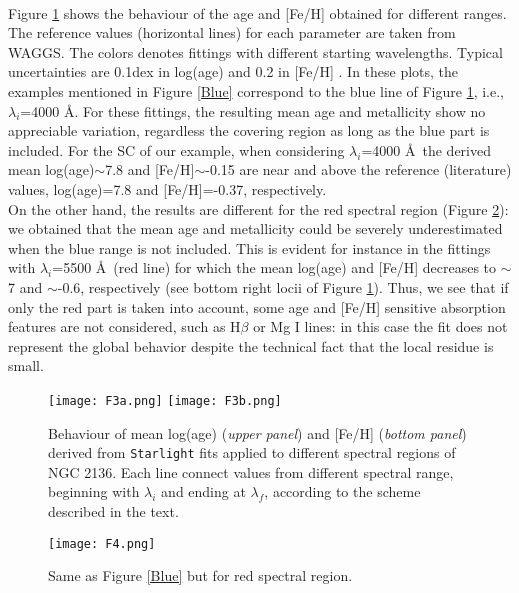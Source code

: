\documentclass[baaa]{baaa}
\begin{document}
\

Figure \ref{Plots} shows the behaviour of the age and [Fe/H] obtained for different ranges. The reference values (horizontal lines) for each parameter are taken from WAGGS. The colors denotes fittings with different starting wavelengths. Typical uncertainties are 0.1dex in log(age) and 0.2 in [Fe/H] \citep{CR2010b}. In these plots, the examples mentioned in Figure \ref{Blue} correspond to the blue line of Figure \ref{Plots}, i.e., $\lambda_i$=4000 \AA. For these fittings, the resulting mean age and metallicity show no appreciable variation, regardless the covering region as long as the blue part is included. For the SC of our example, when considering $\lambda_i$=4000 \AA\ the derived mean log(age)$\sim$7.8 and [Fe/H]$\sim$-0.15 are near and above the reference (literature) values, log(age)=7.8 and [Fe/H]=-0.37, respectively.
\\

On the other hand, the results are different for the red spectral region (Figure \ref{Red}): we  obtained that the mean age and metallicity could be severely underestimated when the blue range is not included. This is evident for instance in the fittings with $\lambda_i$=5500 \AA\ (red line) for which the mean log(age) and [Fe/H] decreases to $\sim$7 and $\sim$-0.6, respectively (see bottom right locii of Figure \ref{Plots}). Thus, we see that if only the red part is taken into account, some  age and [Fe/H] sensitive absorption features are not considered, such as H$\beta$ or Mg I lines: in this case the fit does not represent the global behavior despite the technical fact that the local residue is small.

\begin{figure}[!t]
\centering
\texttt{[image: F3a.png]}
\texttt{[image: F3b.png]}
\caption{Behaviour of mean log(age) (\emph {upper panel}) and [Fe/H] (\emph {bottom panel}) derived from {\tt Starlight} fits applied to different spectral regions of NGC 2136. Each line connect values from different spectral range, beginning with $\lambda_{i}$ and ending at $\lambda_f$, according to the scheme described in the text.}
\label{Plots}
\end{figure}

\begin{figure}[!t]
\centering
\texttt{[image: F4.png]}
\caption{Same as Figure \ref{Blue} but for red spectral region.}
\label{Red}
\end{figure}
\end{document}
